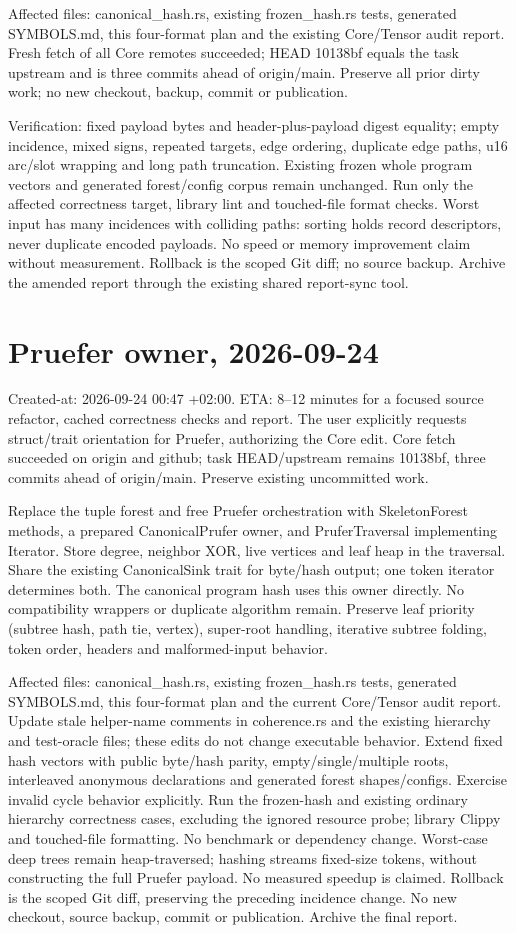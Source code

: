 \documentclass[11pt,a4paper]{article}
\begin{document}
Affected files: canonical\_hash.rs, existing frozen\_hash.rs tests, generated
SYMBOLS.md, this four-format plan and the existing Core/Tensor audit report.
Fresh fetch of all Core remotes succeeded; HEAD 10138bf equals the task
upstream and is three commits ahead of origin/main. Preserve all prior dirty
work; no new checkout, backup, commit or publication.

Verification: fixed payload bytes and header-plus-payload digest equality;
empty incidence, mixed signs, repeated targets, edge ordering, duplicate edge
paths, u16 arc/slot wrapping and long path truncation. Existing frozen whole
program vectors and generated forest/config corpus remain unchanged. Run only
the affected correctness target, library lint and touched-file format checks.
Worst input has many incidences with colliding paths: sorting holds record
descriptors, never duplicate encoded payloads. No speed or memory improvement
claim without measurement. Rollback is the scoped Git diff; no source backup.
Archive the amended report through the existing shared report-sync tool.
\section*{Pruefer owner, 2026-09-24}
Created-at: 2026-09-24 00:47 +02:00. ETA: 8--12 minutes for a focused
source refactor, cached correctness checks and report. The user explicitly
requests struct/trait orientation for Pruefer, authorizing the Core edit.
Core fetch succeeded on origin and github; task HEAD/upstream remains 10138bf,
three commits ahead of origin/main. Preserve existing uncommitted work.

Replace the tuple forest and free Pruefer orchestration with SkeletonForest
methods, a prepared CanonicalPrufer owner, and PruferTraversal implementing
Iterator. Store degree, neighbor XOR, live vertices and leaf heap in the
traversal. Share the existing CanonicalSink trait for byte/hash output; one
token iterator determines both. The canonical program hash uses this owner
directly. No compatibility wrappers or duplicate algorithm remain.
Preserve leaf priority (subtree hash, path tie, vertex), super-root handling,
iterative subtree folding, token order, headers and malformed-input behavior.

Affected files: canonical\_hash.rs, existing frozen\_hash.rs tests, generated
SYMBOLS.md, this four-format plan and the current Core/Tensor audit report.
Update stale helper-name comments in coherence.rs and the existing hierarchy
and test-oracle files; these edits do not change executable behavior.
Extend fixed hash vectors with public byte/hash parity, empty/single/multiple
roots, interleaved anonymous declarations and generated forest shapes/configs.
Exercise invalid cycle behavior explicitly. Run the frozen-hash and existing
ordinary hierarchy correctness cases, excluding the ignored resource probe;
library Clippy and touched-file formatting. No benchmark or dependency change.
Worst-case deep trees remain heap-traversed; hashing streams fixed-size tokens,
without constructing the full Pruefer payload. No measured speedup is claimed.
Rollback is the scoped Git diff, preserving the preceding incidence change.
No new checkout, source backup, commit or publication. Archive the final report.
\end{document}
